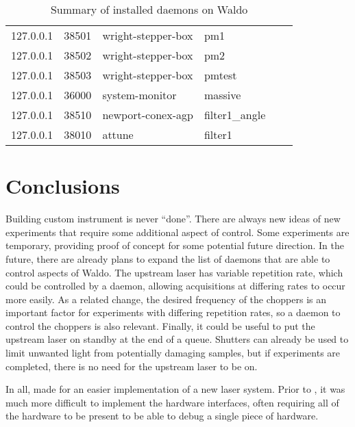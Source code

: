 \begin{table}[]
\begin{tabular}{llllll}
127.0.0.1 & 38501 & wright-stepper-box      & pm1                \\
127.0.0.1 & 38502 & wright-stepper-box      & pm2                \\
127.0.0.1 & 38503 & wright-stepper-box      & pmtest             \\
127.0.0.1 & 36000 & system-monitor          & massive            \\
127.0.0.1 & 38510 & newport-conex-agp       & filter1\_angle     \\
127.0.0.1 & 38010 & attune                  & filter1            \\ \hline
\end{tabular}
\caption[Waldo Daemons]{Summary of installed daemons on Waldo}
\label{waldo:tab:summary}
\end{table}


\clearpage

\section{Conclusions}  %

Building custom instrument is never ``done''.
There are always new ideas of new experiments that require some additional aspect of control.
Some experiments are temporary, providing proof of concept for some potential future direction.
In the future, there are already plans to expand the list of daemons that are able to control aspects of Waldo.
The upstream laser has variable repetition rate, which could be controlled by a daemon, allowing acquisitions at differing rates to occur more easily.
As a related change, the desired frequency of the choppers is an important factor for experiments with differing repetition rates, so a daemon to control the choppers is also relevant.
Finally, it could be useful to put the upstream laser on standby at the end of a queue.
Shutters can already be used to limit unwanted light from potentially damaging samples, but if experiments are completed, there is no need for the upstream laser to be on.

In all, \yaq{} made for an easier implementation of a new laser system.
Prior to \yaq{}, it was much more difficult to implement the hardware interfaces, often requiring all of the hardware to be present to be able to debug a single piece of hardware.

\clearpage
